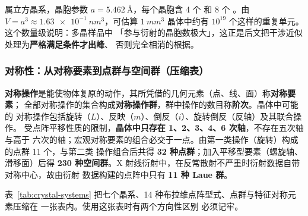 \begin{example}[萤石晶胞的重复单元数]
 属立方晶系，晶胞参数 $a=\qty{5.462}{\angstrom}$，每个晶胞含 4 个 
和 8 个 。由 $V=a^{3}\approx\qty{1.63e-1}{nm^3}$，可估算
$\qty{1}{mm^3}$ 晶体中约有 $10^{19}$ 个这样的重复单元。这个数量级说明：多晶样品中
「参与衍射的晶胞数极大」，这正是后文把干涉近似处理为\textbf{严格满足条件才出峰}、
否则完全相消的根据。
\end{example}

\subsubsection{对称性：从对称要素到点群与空间群（压缩表）}

\textbf{对称操作}是能使物体复原的动作，其所凭借的几何元素（点、线、面）称\textbf{对称要素}；
全部对称操作的集合构成\textbf{对称操作群}，群中操作的数目称\textbf{阶次}。晶体中可能的
对称操作包括旋转（$L$）、反映（$m$）、倒反（$i$）、旋转倒反（反轴）及其联合操作。
受点阵平移性质的限制，\textbf{晶体中只存在 1、2、3、4、6 次轴}，不存在五次轴与高于
六次的轴；宏观对称要素的组合必交于一点。由第一类操作（旋转）构成的点群 11 个，与第二类
操作组合后共得 \textbf{32 种点群}；加入平移型要素（螺旋轴、滑移面）后得
\textbf{230 种空间群}。X 射线衍射中，在反常散射不严重时衍射数据自带对称中心，故由衍射
数据构建的点阵中只有 \textbf{11 种 Laue 群}。

表~\ref{tab:crystal-systems} 把七个晶系、14 种布拉维点阵型式、点群与特征对称元素压缩在
一张表内。使用这张表时有两个方向性区别
必须记牢。

